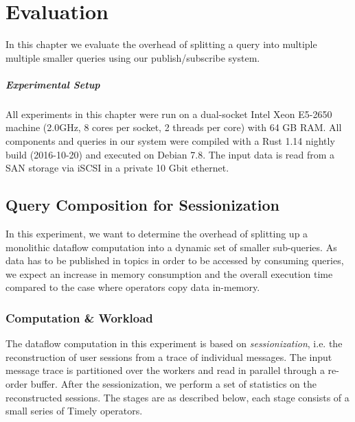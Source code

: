 \chapter{Evaluation}\label{ch:evaluation}

In this chapter we evaluate the overhead of splitting a query into multiple
multiple smaller queries using our publish/subscribe system.

\paragraph{Experimental Setup}

All experiments in this chapter were run on a dual-socket Intel Xeon E5-2650
machine (2.0GHz, 8 cores per socket, 2 threads per core) with 64 GB RAM. All components and
queries in our system were compiled with a Rust 1.14 nightly build (2016-10-20)
and executed on Debian 7.8. The input data is read from a SAN storage via
iSCSI in a private 10 Gbit ethernet.

\section{Query Composition for Sessionization}

In this experiment, we want to determine the overhead of splitting up a monolithic
dataflow computation into a dynamic set of smaller sub-queries. As data has to
be published in topics in order to be accessed by consuming queries, we expect
an increase in memory consumption and the overall execution time compared to
the case where operators copy data in-memory.

\subsection{Computation \& Workload}
The dataflow computation in this experiment is based on \emph{sessionization},
i.e. the reconstruction of user sessions from a trace of individual messages.
The input message trace is partitioned over the workers and read in parallel
through a re-order buffer.
After the sessionization, we perform a set of statistics on the reconstructed
sessions. The stages are as described below, each stage consists of a small
series of Timely operators.

